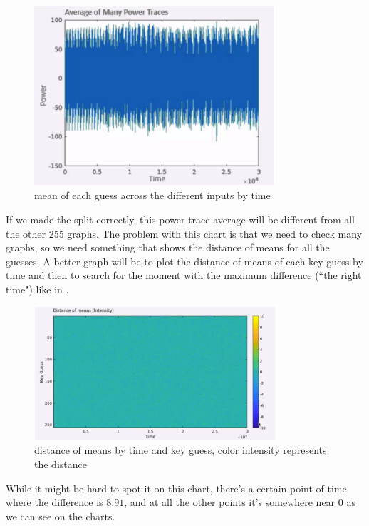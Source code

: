 \begin{figure}[!ht]
    \centering
    \includegraphics[width=0.8\textwidth]{images/Lecture6/avg_of_many_traces.png}
    \caption{mean of each guess across the different inputs by time} \label{fig:avg_of_many_traces}
\end{figure}

If we made the split correctly, this power trace average will be different from all the other 255 graphs. The problem with this chart is that we need to check many graphs, so we need something that shows the distance of means for all the guesses. A better graph will be to plot the distance of means of each key guess by time and then to search for the moment with the maximum difference (``the right time") like in .

\begin{figure}[!ht]
    \centering
    \includegraphics[width=0.8\textwidth]{images/Lecture6/intensity_represents_means_diff.png}
    \caption{distance of means by time and key guess, color intensity represents the distance} \label{fig:intensity_represents_means_diff}
\end{figure}

While it might be hard to spot it on this chart, there's a certain point of time where the difference is $8.91$, and at all the other points it's somewhere near 0 as we can see on the charts.

